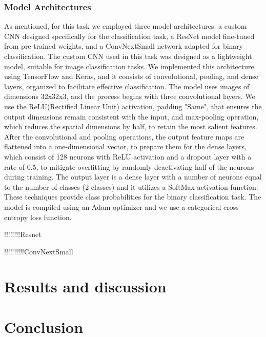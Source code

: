 \documentclass[runningheads]{llncs}
\begin{document}
\subsubsection{Model Architectures } As mentioned, for this task we employed three model architectures:  a custom CNN designed specifically for the classification task, a ResNet model fine-tuned from pre-trained weights, and a ConvNextSmall network adapted for binary classification. 
The custom CNN used in this task was designed as a lightweight model, suitable for image classification tasks. We implemented this architecture using TensorFlow and Keras, and it consists of convolutional, pooling, and dense layers, organized to facilitate effective classification. The model uses images of dimensions 32x32x3, and the process begins with three convolutional layers. We use the ReLU(Rectified Linear Unit) activation, padding "Same", that ensures the output dimensions remain consistent with the input, and max-pooling operation, which reduces the spatial dimensions by half, to retain the most salient features. After the convolutional and pooling operations, the output feature maps are flattened into a one-dimensional vector, to prepare them for the dense layers, which consist of 128 neurons with ReLU activation and a dropout layer with a rate of 0.5, to mitigate overfitting by randomly deactivating half of the neurons during training. The output layer is a dense layer with a number of neurons equal to the number of classes (2 classes) and it utilizes a SoftMax activation function. These techniques provide class probabilities for the binary classification task. The model is compiled using an Adam optimizer and we use a categorical cross-entropy loss function.

!!!!!!!!Resnet

!!!!!!!!!!ConvNextSmall

%
%
\section{Results and discussion}

%
%
\section{Conclusion}


%
%
%


\end{document}
